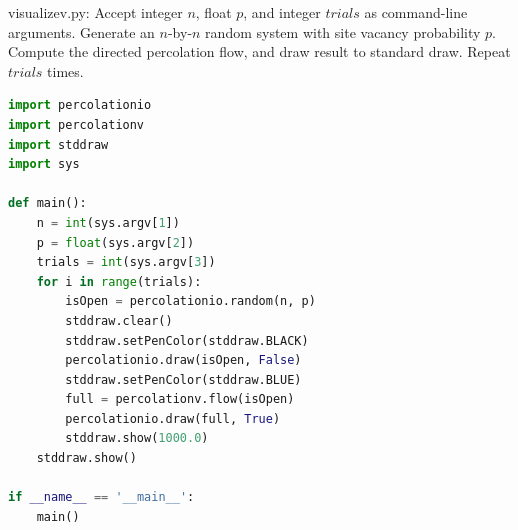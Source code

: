 \documentclass[8pt,a4paper,compress]{beamer}
\begin{document}
\begin{frame}[fragile]
\pause

\begin{framed}
\tiny visualizev.py: Accept integer $n$, float $p$, and integer $trials$ as command-line arguments. Generate an $n$-by-$n$ random system with site vacancy probability $p$. Compute the directed percolation flow, and draw result to standard draw. Repeat $trials$ times.
\end{framed}

\begin{lstlisting}[language=Python]
import percolationio
import percolationv
import stddraw
import sys

def main():
    n = int(sys.argv[1])
    p = float(sys.argv[2])
    trials = int(sys.argv[3])
    for i in range(trials):
        isOpen = percolationio.random(n, p)
        stddraw.clear()
        stddraw.setPenColor(stddraw.BLACK)
        percolationio.draw(isOpen, False)
        stddraw.setPenColor(stddraw.BLUE)
        full = percolationv.flow(isOpen)
        percolationio.draw(full, True)
        stddraw.show(1000.0)
    stddraw.show()

if __name__ == '__main__':
    main()
\end{lstlisting}
\end{frame}
\end{document}
